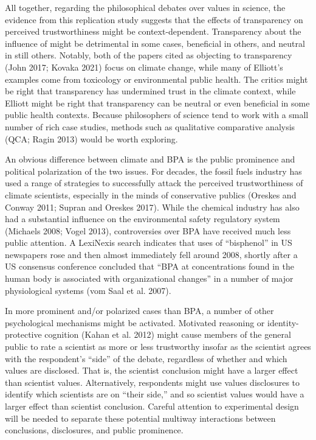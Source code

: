 \documentclass[
  letterpaper,
  DIV=11,
  numbers=noendperiod]{scrartcl}
\begin{document}
All together, regarding the philosophical debates over values in
science, the evidence from this replication study suggests that the
effects of transparency on perceived trustworthiness might be
context-dependent. Transparency about the influence of might be
detrimental in some cases, beneficial in others, and neutral in still
others. Notably, both of the papers cited as objecting to transparency
(John 2017; Kovaka 2021) focus on climate change, while many of
Elliott's examples come from toxicology or environmental public health.
The critics might be right that transparency has undermined trust in the
climate context, while Elliott might be right that transparency can be
neutral or even beneficial in some public health contexts. Because
philosophers of science tend to work with a small number of rich case
studies, methods such as qualitative comparative analysis (QCA; Ragin
2013) would be worth exploring.

An obvious difference between climate and BPA is the public prominence
and political polarization of the two issues. For decades, the fossil
fuels industry has used a range of strategies to successfully attack the
perceived trustworthiness of climate scientists, especially in the minds
of conservative publics (Oreskes and Conway 2011; Supran and Oreskes
2017). While the chemical industry has also had a substantial influence
on the environmental safety regulatory system (Michaels 2008; Vogel
2013), controversies over BPA have received much less public attention.
A LexiNexis search indicates that uses of ``bisphenol'' in US newspapers
rose and then almost immediately fell around 2008, shortly after a US
consensus conference concluded that ``BPA at concentrations found in the
human body is associated with organizational changes'' in a number of
major physiological systems (vom Saal et al. 2007).

In more prominent and/or polarized cases than BPA, a number of other
psychological mechanisms might be activated. Motivated reasoning or
identity-protective cognition (Kahan et al. 2012) might cause members of
the general public to rate a scientist as more or less trustworthy
insofar as the scientist agrees with the respondent's ``side'' of the
debate, regardless of whether and which values are disclosed. That is,
the scientist conclusion might have a larger effect than scientist
values. Alternatively, respondents might use values disclosures to
identify which scientists are on ``their side,'' and so scientist values
would have a larger effect than scientist conclusion. Careful attention
to experimental design will be needed to separate these potential
multiway interactions between conclusions, disclosures, and public
prominence.
\end{document}
